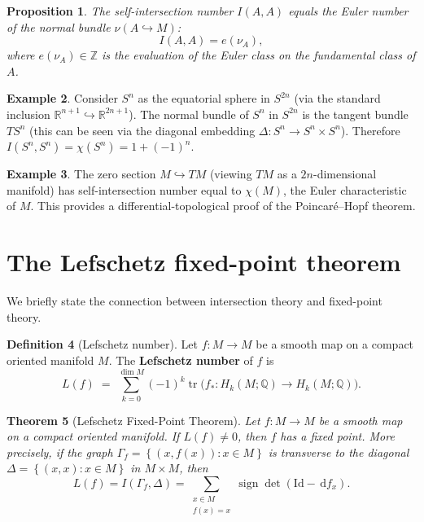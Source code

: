\documentclass[12pt,a4paper,openany]{book}
\newtheorem{theorem}{Theorem}[section]
\newtheorem{proposition}[theorem]{Proposition}
\theoremstyle{definition}
\newtheorem{definition}[theorem]{Definition}
\newtheorem{example}[theorem]{Example}
\theoremstyle{remark}
\newcommand{\Z}{\mathbb{Z}}
\newcommand{\Q}{\mathbb{Q}}
\newcommand{\R}{\mathbb{R}}
\newcommand{\Id}{\mathrm{Id}}
\newcommand{\dd}{\,\mathrm{d}}
\newcommand{\set}[1]{\left\{ #1 \right\}}
\begin{document}
\begin{proposition}\label{prop:self-intersection-euler}
The self-intersection number $I(A, A)$ equals the Euler number of the
normal bundle $\nu(A \hookrightarrow M)$:
\[
  I(A, A) = e(\nu_A),
\]
where $e(\nu_A) \in \Z$ is the evaluation of the Euler class on the
fundamental class of $A$.
\end{proposition}

\begin{example}\label{ex:self-intersection-sphere-sphere}
Consider $S^n$ as the equatorial sphere in $S^{2n}$ (via the standard
inclusion $\R^{n+1} \hookrightarrow \R^{2n+1}$). The normal bundle of
$S^n$ in $S^{2n}$ is the tangent bundle $TS^n$ (this can be seen via the
diagonal embedding $\Delta \colon S^n \to S^n \times S^n$). Therefore
$I(S^n, S^n) = \chi(S^n) = 1 + (-1)^n$.
\end{example}

\begin{example}\label{ex:self-intersection-zero-section}
The zero section $M \hookrightarrow TM$ (viewing $TM$ as a $2n$-dimensional
manifold) has self-intersection number equal to $\chi(M)$, the Euler
characteristic of $M$. This provides a differential-topological proof of
the Poincar\'e--Hopf theorem.
\end{example}

\section{The Lefschetz fixed-point theorem}\label{sec:lefschetz}

We briefly state the connection between intersection theory and fixed-point
theory.

\begin{definition}[Lefschetz number]\label{def:lefschetz-number}
Let $f \colon M \to M$ be a smooth map on a compact oriented manifold $M$.
The \textbf{Lefschetz number} of $f$ is
\[
  L(f) \;=\; \sum_{k=0}^{\dim M} (-1)^k \operatorname{tr}\bigl(
    f_* \colon H_k(M; \Q) \to H_k(M; \Q)\bigr).
\]
\end{definition}

\begin{theorem}[Lefschetz Fixed-Point Theorem]\label{thm:lefschetz}
Let $f \colon M \to M$ be a smooth map on a compact oriented manifold.
If $L(f) \neq 0$, then $f$ has a fixed point. More precisely, if the graph
$\Gamma_f = \set{(x, f(x)) : x \in M}$ is transverse to the diagonal
$\Delta = \set{(x,x) : x \in M}$ in $M \times M$, then
\[
  L(f) = I(\Gamma_f, \Delta) = \sum_{\substack{x \in M \\ f(x)=x}}
    \operatorname{sign}\det(\Id - \dd f_x).
\]
\end{theorem}
\end{document}
